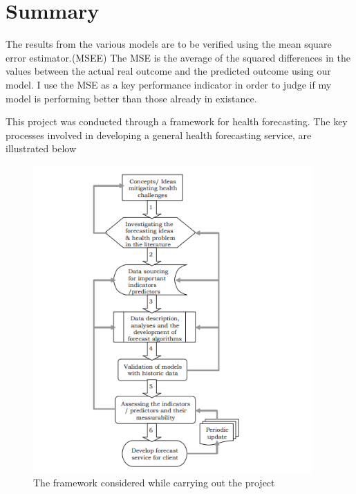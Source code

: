 \documentclass[12pt]{report}
\begin{document}
\section{Summary}

The results from the various models are to be verified using the mean square error estimator.(MSEE) The MSE is the average of the squared  differences in the values between the actual real outcome and the predicted outcome using our model. I use the MSE as a key performance indicator in order to judge if my model is performing better than those already in existance.

This project was conducted through a framework for health forecasting. The key processes
involved in developing a general health forecasting service, are illustrated below

\begin{figure}[H]%
  \begin {center}
  \includegraphics[width=0.95\textwidth]{images/FlowChart.png}
  \caption{The framework considered while carrying out the project}
  \label{fig:ecg}
  \end {center}
\end{figure}
\end{document}

